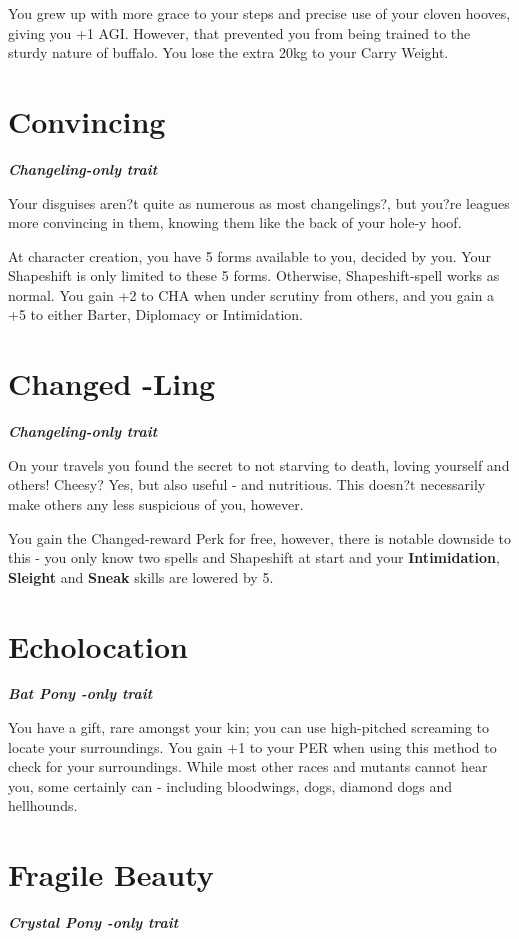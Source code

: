 \documentclass[11pt,a4paper,twocolumn]{book}
\begin{document}
	You grew up with more grace to your steps and precise use of your cloven hooves, giving you +1 AGI. However, that prevented you from being trained to the sturdy nature of buffalo. You lose the extra 20kg to your Carry Weight.
	
	\section*{Convincing}
	\emph{\textbf{Changeling-only trait}}
	
	Your disguises aren?t quite as numerous as most changelings?, but you?re leagues more convincing in them, knowing them like the back of your hole-y hoof.
	
	At character creation, you have 5 forms available to you, decided by you. Your Shapeshift is only limited to these 5 forms. Otherwise, Shapeshift-spell works as normal. You gain +2 to CHA when under scrutiny from others, and you gain a +5 to either Barter, Diplomacy or Intimidation.
	
	\section*{Changed -Ling}
	\emph{\textbf{Changeling-only trait}}
	
	On your travels you found the secret to not starving to death, loving yourself and others! Cheesy? Yes, but also useful - and nutritious. This doesn?t necessarily make others any less suspicious of you, however.
	
	You gain the Changed-reward Perk for free, however, there is notable downside to this - you only know two spells and Shapeshift at start and your \textbf{Intimidation}, \textbf{Sleight} and \textbf{Sneak} skills are lowered by 5.
	
	\section*{Echolocation}
	\emph{\textbf{Bat Pony -only trait}}
	
	You have a gift, rare amongst your kin; you can use high-pitched screaming to locate your surroundings. You gain +1 to your PER when using this method to check for your surroundings. While most other races and mutants cannot hear you, some certainly can - including bloodwings, dogs, diamond dogs and hellhounds.
	
	\section*{Fragile Beauty}
	\emph{\textbf{Crystal Pony -only trait}}
	
\end{document}
